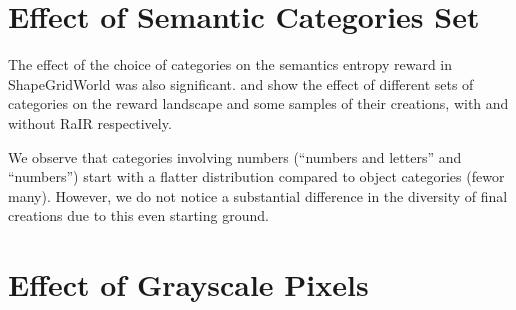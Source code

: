 \section{Effect of Semantic Categories Set}
\label{sec:sgw-categories}
The effect of the choice of categories on the semantics entropy reward in ShapeGridWorld was also significant.
 and  show the effect of different sets of categories on the reward landscape and some samples of their creations, with and without RaIR respectively.

We observe that categories involving numbers (``numbers and letters'' and ``numbers'') start with a flatter distribution compared to object categories (few\footnotemark[1] or many\footnotemark[2]).
However, we do not notice a substantial difference in the diversity of final creations due to this even starting ground.




\section{Effect of Grayscale Pixels}
\label{sec:sgw-grayscale}


